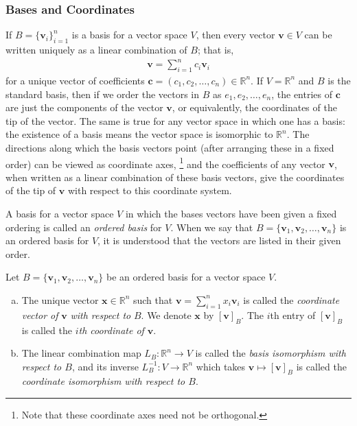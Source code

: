 \documentclass[12pt,letterpaper,reqno]{article}
\numberwithin{equation}{section}
\newcommand{\R}{\ensuremath{\mathbb R}}
\begin{document}
\subsubsection{Bases and Coordinates}
If $B=\{\mathbf{v}_i\}_{i=1}^n$ is a basis for a vector space $V$, then every vector $\mathbf{v} \in V$ can be written uniquely as a linear combination of $B$; that is,
\begin{align*}
	\mathbf{v}=\sum_{i=1}^nc_i\mathbf{v}_i
\end{align*}
for a unique vector of coefficients $\mathbf{c}=(c_1,c_2,\dots,c_n) \in \R^n$. If $V=\R^n$ and $B$ is the standard basis, then if we order the vectors in $B$ as $e_1,e_2,\dots,e_n$, the entries of $\mathbf{c}$ are just the components of the vector $\mathbf{v}$, or equivalently, the coordinates of the tip of the vector. The same is true for any vector space in which one has a basis: the existence of a basis means the vector space is isomorphic to $\R^n$. The directions along which the basis vectors point (after arranging these in a fixed order) can be viewed as coordinate axes, \footnote{Note that these coordinate axes need not be orthogonal.} and the coefficients of any vector $\mathbf{v}$, when written as a linear combination of these basis vectors, give the coordinates of the tip of $\mathbf{v}$ with respect to this coordinate system.

\begin{defn}
	A basis for a vector space $V$ in which the bases vectors have been given a fixed ordering is called an \emph{ordered basis} for $V$. When we say that $B=\{\mathbf{v}_1, \mathbf{v}_2, \dots, \mathbf{v}_n\}$ is an ordered basis for $V$, it is understood that the vectors are listed in their given order.
\end{defn}


\begin{defn}
	Let $B=\{\mathbf{v}_1,\mathbf{v}_2,\dots,\mathbf{v}_n\}$ be an ordered basis for a vector space $V$.
	\begin{enumerate}[(a)]
		\item The unique vector $\mathbf{x} \in \R^n$ such that $\mathbf{v}=\sum_{i=1}^nx_i\mathbf{v}_i$ is called the \emph{coordinate vector of } $\mathbf{v}$ \emph{with respect to } $B$. We denote $\mathbf{x}$ by $[\mathbf{v}]_B$. The $i$th entry of $[\mathbf{v}]_B$ is called the \emph{$i$th coordinate of $\mathbf{v}$}.
		\item The linear combination map $L_B:\R^n \to V$ is called the \emph{basis isomorphism with respect to $B$}, and its inverse $L_B^{-1}:V \to \R^n$ which takes $\mathbf{v} \mapsto [\mathbf{v}]_B$ is called the \emph{coordinate isomorphism with respect to $B$}. 
	\end{enumerate}
\end{defn}
\end{document}
